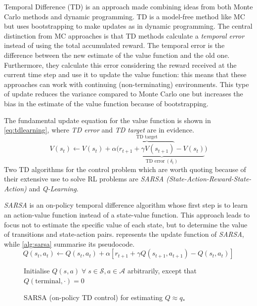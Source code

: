 Temporal Difference (TD) is an approach made combining ideas from both Monte Carlo methods and dynamic programming. TD is a model-free method like MC but uses bootstrapping to make updates as in dynamic programming. The central distinction from MC approaches is that TD methods calculate a \textit{temporal error} instead of using the total accumulated reward. The temporal error is the difference between the new estimate of the value function and the old one. Furthermore, they calculate this error considering the reward received at the current time step and use it to update the value function: this means that these approaches can work with continuing (non-terminating) environments.
This type of update reduces the variance compared to Monte Carlo one but increases the bias in the estimate of the value function because of bootstrapping.

The fundamental update equation for the value function is shown in \vref{eq:tdlearning}, where \textit{TD error} and \textit{TD target} are in evidence.
 \begin{equation}\label{eq:tdlearning}
	V(s_t) \leftarrow V(s_t) + \alpha \big(\underbrace{\overbrace{r_{t+1} + \gamma V(s_{t+1})}^{\text{TD target}}- V(s_t)}_{\text{TD error} \ (\delta_t)}\big)
\end{equation}
Two TD algorithms for the control problem which are worth quoting because of their extensive use to solve RL problems are \textit{SARSA (State-Action-Reward-State-Action)} and \textit{Q-Learning}.

\textit{SARSA} is an on-policy temporal difference algorithm whose first step is to learn an action-value function instead of a state-value function. This approach leads to focus not to estimate the specific value of each state, but to determine the value of transitions and state-action pairs.  represents the update function of \textit{SARSA}, while \vref{alg:sarsa} summarise its pseudocode.
\begin{equation}\label{eq:sarsa}
Q(s_t, a_t) \leftarrow Q(s_t, a_t) + \alpha [r_{t+1} + \gamma Q(s_{t+1}, a_{t+1}) - Q(s_t, a_t)]
\end{equation}
\begin{figure}
	
	\begin{algorithm}[H]
		\SetAlgoLined
		\DontPrintSemicolon
		\LinesNumbered
		\KwIn{step size $\alpha \in (0,1]$, small $\epsilon > 0$\;}
		Initialise $Q(s,a) \; \forall\; s \in \mathcal{S}, a \in \mathcal{A}$ arbitrarily, except that $Q(\text{terminal}, \cdot) = 0$\;
		\caption{SARSA (on-policy TD control) for estimating $Q \approx q_*$}
		\label{alg:sarsa}
	\end{algorithm}
\end{figure}

